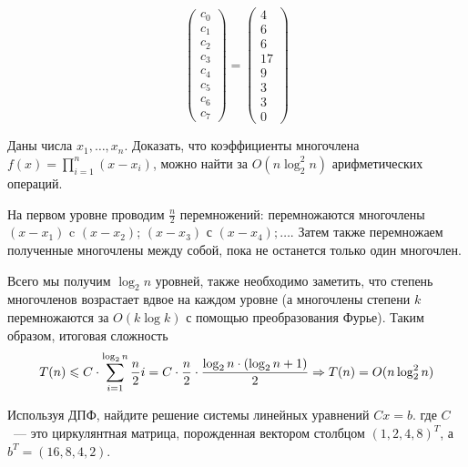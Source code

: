 \documentclass[a4paper,12pt]{article}
\begin{document}
\begin{solution}
	\begin{equation*}
	\left(
	\begin{array}{c}
	c_0 \\
	c_1 \\
	c_2 \\
	c_3 \\
	c_4 \\
	c_5 \\
	c_6 \\
	c_7
	\end{array}
	\right) =  \left(
	\begin{array}{c}
	4 \\
	6 \\
	6 \\
	17 \\
	9 \\
	3 \\
	3 \\
	0
	\end{array}
	\right)
	\end{equation*}
	
\end{solution}

\begin{task}
	Даны числа $x_1,\dotsc, x_n$. Доказать, что коэффициенты многочлена  $f(x) = \displaystyle\prod_{i = 1}^n (x-x_i)$, можно найти за $O(n \log_2^2 n)$ арифметических операций.
\end{task}

\begin{solution}
	На первом уровне проводим $\frac{n}{2}$ перемножений: перемножаются многочлены $(x-x_1)$ c $(x-x_2)$; $(x-x_3)$ с $(x-x_4); \ldots$. Затем также перемножаем полученные многочлены между собой, пока не останется только один многочлен.
	
	Всего мы получим $\log_2 n$ уровней, также необходимо заметить, что степень многочленов возрастает вдвое на каждом уровне (а многочлены степени $k$ перемножаются за $O(k\log k)$ с помощью преобразования Фурье). Таким образом, итоговая сложность \[T(n) \leqslant C \cdot \displaystyle \sum_{i = 1}^{\log_2 n} \dfrac{n}{2} i = C \cdot \dfrac{n}{2} \cdot \dfrac{\log_2 n \cdot (\log_2 n + 1)}{2} \Rightarrow T(n) = O(n \log_2^2 n)\]
\end{solution}

\begin{task}
	Используя  ДПФ, найдите решение системы линейных уравнений $Cx=b$. где $C$~--- это циркулянтная матрица, порожденная вектором столбцом $(1,2,4,8)^T$, а $b^T=(16,8,4,2)$.
\end{task}
\end{document}
